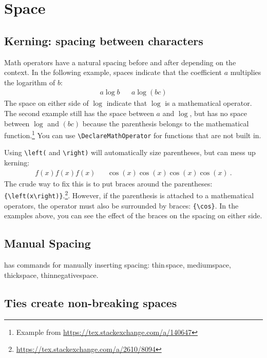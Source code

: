 \section{Space}

\subsection{Kerning: spacing between characters}
Math operators have a natural spacing before and after depending on the context. In the following example, spaces indicate that the coefficient $a$ multiplies the logarithm of $b$:
\begin{align}
	a\log b && a\log(bc)
\end{align}
The space on either side of $\log$ indicate that $\log$ is a mathematical operator. The second example still has the space between $a$ and $\log$, but has no space between $\log$ and $(bc)$ because the parenthesis belongs to the mathematical function.\footnote{Example from \url{https://tex.stackexchange.com/a/140647}}
% 
You can use \verb!\DeclareMathOperator! for functions that are not built in.

Using \verb!\left(! and \verb!\right)! will automatically size parentheses, but can mess up kerning:
\begin{align}
	f(x)
	f\left(x\right)
	f{\left(x\right)}
	&
	&
	\cos(x)
	\cos\left(x\right)
	\cos{\left(x\right)}
	{\cos}{\left(x\right)}
	\ .
\end{align}
The crude way to fix this is to put braces around the parentheses: \verb!{\left(x\right)}!.\footnote{\url{https://tex.stackexchange.com/a/2610/8094}}. However, if the parenthesis is attached to a mathematical operators, the operator must also be surrounded by braces: \verb!{\cos}!. In the examples above, you can see the effect of the braces on the spacing on either side.



\subsection{Manual Spacing}

\LaTeXx has commands for manually inserting spacing: thin\,space, medium\:space, thick\;space, thin\!negative\!space.


\subsection{Ties create non-breaking spaces}

